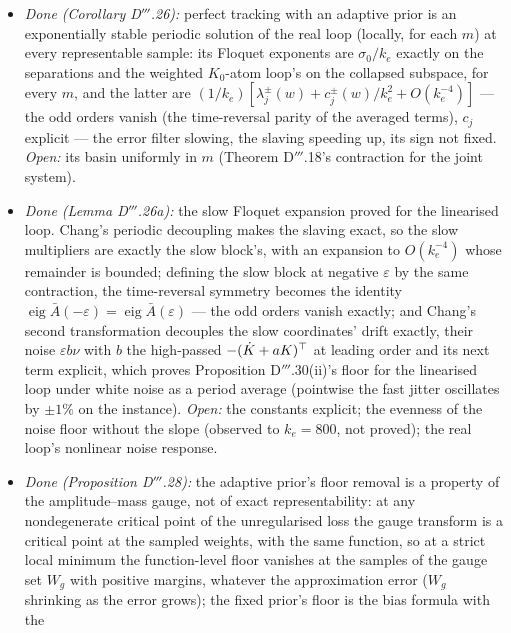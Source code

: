 \begin{enumerate}[label=\arabic*.,leftmargin=*]
\begin{itemize}
      (Corollary D$'''$.26); the plateaus of the unregularised loss that the fast limit exposes; the constants of (v).
    \item \emph{Done (Corollary D$'''$.26):} perfect tracking with an adaptive prior is an exponentially stable
      periodic solution of the real loop (locally, for each $m$) at every representable sample: its Floquet exponents
      are $\sigma_0/k_e$ exactly on the separations and the weighted $K_0$-atom loop's on the collapsed subspace, for
      every $m$, and the latter are $(1/k_e)[\lambda_j^\pm(w) + c_j^\pm(w)/k_e^2 + O(k_e^{-4})]$ --- the odd orders
      vanish (the time-reversal parity of the averaged terms), $c_j$ explicit --- the error filter slowing, the
      slaving speeding up, its sign not fixed. \emph{Open:} its basin uniformly in $m$ (Theorem D$'''$.18's
      contraction for the joint system).
    \item \emph{Done (Lemma D$'''$.26a):} the slow Floquet expansion proved for the linearised loop. Chang's periodic
      decoupling makes the slaving exact, so the slow multipliers are exactly the slow block's, with an expansion to
      $O(k_e^{-4})$ whose remainder is bounded; defining the slow block at negative $\varepsilon$ by the same
      contraction, the time-reversal symmetry becomes the identity
      $\operatorname{eig}\bar A(-\varepsilon) = \operatorname{eig}\bar A(\varepsilon)$ --- the odd orders vanish
      exactly; and Chang's second transformation decouples the slow coordinates' drift exactly, their noise
      $\varepsilon b\nu$ with $b$ the high-passed $-(\dot K + aK)^\top$ at leading order and its next term explicit,
      which proves Proposition D$'''$.30(ii)'s floor for the linearised loop under white noise as a period average
      (pointwise the fast jitter oscillates by $\pm1\%$ on the instance). \emph{Open:} the constants explicit; the
      evenness of the noise floor without the slope (observed to $k_e = 800$, not proved); the real loop's nonlinear
      noise response.
    \item \emph{Done (Proposition D$'''$.28):} the adaptive prior's floor removal is a property of the amplitude--mass
      gauge, not of exact representability: at any nondegenerate critical point of the unregularised loss the gauge
      transform is a critical point at the sampled weights, with the same function, so at a strict local minimum the
      function-level floor vanishes at the samples of the gauge set $W_g$ with positive margins, whatever the
      approximation error ($W_g$ shrinking as the error grows); the fixed prior's floor is the bias formula with the

\end{itemize}
\end{enumerate}
